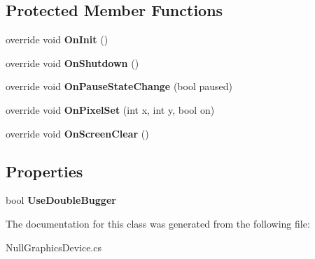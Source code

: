 \subsection*{Protected Member Functions}
\begin{DoxyCompactItemize}
\item 
\hypertarget{class_eimu_1_1_devices_1_1_null_graphics_device_a144d0af64efe168f2a4c7f21b6b62a8c}{
override void {\bfseries OnInit} ()}
\label{class_eimu_1_1_devices_1_1_null_graphics_device_a144d0af64efe168f2a4c7f21b6b62a8c}

\item 
\hypertarget{class_eimu_1_1_devices_1_1_null_graphics_device_a4f4fb82f48b62b77b4fccd3dbf6c56e0}{
override void {\bfseries OnShutdown} ()}
\label{class_eimu_1_1_devices_1_1_null_graphics_device_a4f4fb82f48b62b77b4fccd3dbf6c56e0}

\item 
\hypertarget{class_eimu_1_1_devices_1_1_null_graphics_device_a754b76b8fe71e88411357293254947ca}{
override void {\bfseries OnPauseStateChange} (bool paused)}
\label{class_eimu_1_1_devices_1_1_null_graphics_device_a754b76b8fe71e88411357293254947ca}

\item 
\hypertarget{class_eimu_1_1_devices_1_1_null_graphics_device_a194984eb4ed69e0d92639190a6692c18}{
override void {\bfseries OnPixelSet} (int x, int y, bool on)}
\label{class_eimu_1_1_devices_1_1_null_graphics_device_a194984eb4ed69e0d92639190a6692c18}

\item 
\hypertarget{class_eimu_1_1_devices_1_1_null_graphics_device_a7421d2b1b5988b9137fad8e5207c75cb}{
override void {\bfseries OnScreenClear} ()}
\label{class_eimu_1_1_devices_1_1_null_graphics_device_a7421d2b1b5988b9137fad8e5207c75cb}

\end{DoxyCompactItemize}
\subsection*{Properties}
\begin{DoxyCompactItemize}
\item 
\hypertarget{class_eimu_1_1_devices_1_1_null_graphics_device_a4ecb5d5a14ee5920cc9754921a088df2}{
bool {\bfseries UseDoubleBugger}}
\label{class_eimu_1_1_devices_1_1_null_graphics_device_a4ecb5d5a14ee5920cc9754921a088df2}

\end{DoxyCompactItemize}


The documentation for this class was generated from the following file:\begin{DoxyCompactItemize}
\item 
NullGraphicsDevice.cs\end{DoxyCompactItemize}
